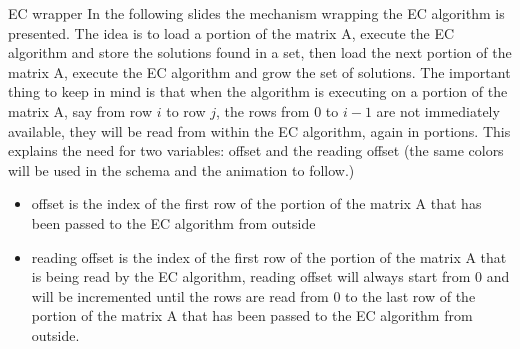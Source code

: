 \documentclass{beamer}
\begin{document}
\begin{frame}{EC wrapper}
    In the following slides the mechanism wrapping the EC algorithm
    is presented. 
    The idea is to load a portion of the matrix A, execute the EC algorithm
    and store the solutions found in a set, then load the next portion of
    the matrix A, execute the EC algorithm and grow the set of solutions.
    The important thing to keep in mind is that when the algorithm 
    is executing on a portion of the matrix A, say from row $i$ to row $j$,
    the rows from $0$ to $i-1$ are not immediately available, they will
    be read from within the EC algorithm, again in portions.
    This explains the need for two variables:
    \textcolor{offset}{offset} and the \textcolor{reading_offset}{reading offset}
    (the same colors will be used in the schema and the animation to follow.)
\end{frame}

\begin{frame}{}
    \begin{itemize}
        \item \textcolor{offset}{offset} is the index of the first row of the portion
            of the matrix A that has been passed to the EC algorithm from outside
        \item \textcolor{reading_offset}{reading offset} is the index of the first row of the portion
            of the matrix A that is being read by the EC algorithm,
            reading offset will always start from 0 and will be incremented until
            the rows are read from 0 to the last row of the portion of the matrix A 
            that has been passed to the EC algorithm from outside.
    \end{itemize}
\end{frame}
\end{document}
